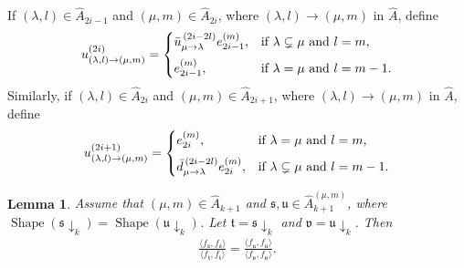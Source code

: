 \documentclass[11pt,a4paper,reqno,svgnames]{amsart}
\theoremstyle{plain}
\newtheorem{lemma}[theorem]{Lemma}
\theoremstyle{definition}
\numberwithin{equation}{section}
\begin{document}
If $(\lambda,l)\in\hat{A}_{2i-1}$ and $(\mu,m)\in\hat{A}_{2i}$, where $(\lambda,l)\to(\mu,m)$ in $\hat{A}$, define 
\begin{align*}
u_{(\lambda,l)\to(\mu,m)}^{(2i)}=
\begin{cases}
\bar{u}^{\,(2i-2l)}_{\mu\to\lambda}e_{2i-1}^{(m)},&\text{if $\lambda\subsetneq\mu$ and $l=m$,}\medskip\\
e_{2i-1}^{(m)},&\text{if $\lambda=\mu$ and $l=m-1$.}
\end{cases}
\end{align*}
Similarly, if $(\lambda,l)\in\hat{A}_{2i}$ and $(\mu,m)\in\hat{A}_{2i+1}$, where $(\lambda,l)\to(\mu,m)$ in $\hat{A}$, define
\begin{align*}
u_{(\lambda,l)\to(\mu,m)}^{(2i+1)}=
\begin{cases}
e_{2i}^{(m)},&\text{if $\lambda=\mu$ and $l=m$, }\medskip\\
\bar{d}_{\mu\to\lambda}^{\,(2i-2l)}e_{2i}^{(m)},&\text{if $\lambda\subsetneq\mu$ and $l=m-1$.}
\end{cases}
\end{align*}
\begin{lemma}\label{observation:0}
Assume that $(\mu,m)\in\hat{A}_{k+1}$ and $\mathfrak{s},\mathfrak{u}\in\hat{A}_{k+1}^{(\mu,m)}$, where $\operatorname{Shape}(\mathfrak{s}\downarrow_{k})= \operatorname{Shape}(\mathfrak{u}\downarrow_{k})$. Let $\mathfrak{t}=\mathfrak{s}\downarrow_k$ and $\mathfrak{v}=\mathfrak{u}\downarrow_k$. Then
\begin{align*}
\frac{\langle f_\mathfrak{s},f_\mathfrak{s}\rangle}{ \langle f_\mathfrak{t},f_\mathfrak{t}\rangle}=
\frac{\langle f_\mathfrak{u},f_\mathfrak{u}\rangle}{ \langle f_\mathfrak{v},f_\mathfrak{v}\rangle}.
\end{align*}
\end{lemma}
\end{document}
